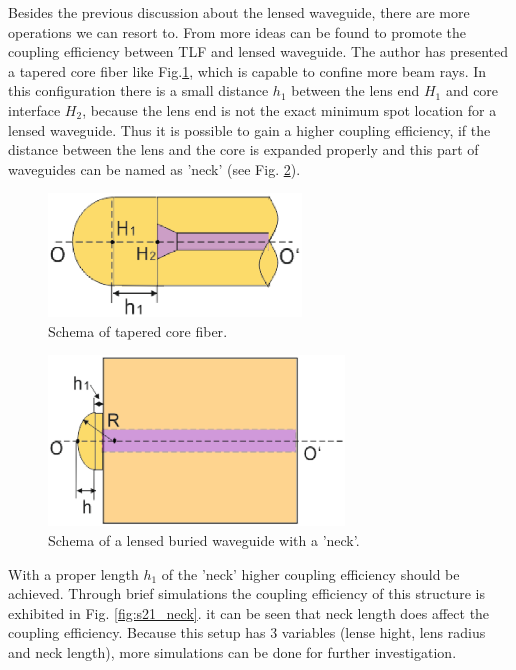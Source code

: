Besides the previous discussion about the lensed waveguide, there are more operations we can resort to. From \cite{integrated_coupling_between_LD_SMF} more ideas can be found to promote the coupling efficiency between TLF and lensed waveguide. The author has presented a tapered core fiber like Fig.\ref{fig:tapered_core_fiber}, which is capable to confine more beam rays. In this configuration there is a small distance $h_{1}$ between the lens end $H_{1}$ and core interface $H_{2}$, because the lens end is not the exact minimum spot location for a lensed waveguide. Thus it is possible to gain a higher coupling efficiency, if the distance between the lens and the core is expanded properly and this part of waveguides can be named as 'neck' (see Fig. \ref{fig:lensed_waveguide_neck}).\\ 

\begin{figure}[!ht]
\centering
\includegraphics[width=0.6\textwidth]{bilder/tapered_core_fiber}
\caption {Schema of tapered core fiber\cite{integrated_coupling_between_LD_SMF}.}
\label{fig:tapered_core_fiber}
\end{figure}
\begin{figure}[!ht]
\centering
\includegraphics[width=0.7\textwidth]{bilder/lensed_waveguide_neck}
\caption {Schema of a lensed buried waveguide with a 'neck'.}
\label{fig:lensed_waveguide_neck}
\end{figure}
With a proper length $h_{1}$ of the 'neck'  higher coupling efficiency should be achieved. Through brief simulations the coupling efficiency of this structure is exhibited in Fig. \ref{fig:s21_neck}. it can be seen that neck length does affect the coupling efficiency. Because this setup has 3 variables (lense hight, lens radius and neck length), more simulations can be done for further investigation.\\

